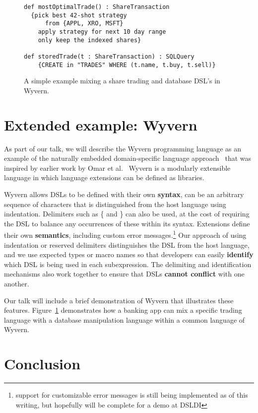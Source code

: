 \documentclass{sigplanconf}
\begin{document}
\begin{figure}[t]
\begin{lstlisting}
def mostOptimalTrade() : ShareTransaction
  {pick best 42-shot strategy
      from {APPL, XRO, MSFT}
    apply strategy for next 10 day range
    only keep the indexed shares}

def storedTrade(t : ShareTransaction) : SQLQuery
    {CREATE in "TRADES" WHERE (t.name, t.buy, t.sell)}
\end{lstlisting}
\caption{A simple example mixing a share trading and database DSL's in Wyvern.}
\label{f:dsl}
\end{figure}


\section{Extended example: Wyvern}

As part of our talk, we will describe the Wyvern programming language
as an example of the naturally embedded domain-specific language
approach~\cite{omar:2014:tsls} that was inspired by earlier work by Omar et al.~\cite{ACC_VLHCC}
Wyvern is a modularly extensible language in which language
extensions can be defined as libraries.

Wyvern allows DSLs to be defined with their own \textbf{syntax}, can be
an arbitrary sequence of characters that is distinguished from the host
language using indentation.  Delimiters such as \{ and \} can also be
used, at the cost of requiring the DSL to balance any occurrences of
these within its syntax.  Extensions define their own \textbf{semantics},
including custom error messages.\footnote{support for customizable
error messages is still being implemented as of this writing, but
hopefully will be complete for a demo at DSLDI}  Our approach of
using indentation or reserved delimiters distinguishes the DSL from
the host language, and we use expected types or macro names so that
developers can easily \textbf{identify} which DSL is being used in each
subexpression.  The delimiting and identification mechanisms also work
together to ensure that DSLs \textbf{cannot conflict} with one another.

Our talk will include a brief demonstration of Wyvern that illustrates
these features. Figure~\ref{f:dsl} demonstrates how a banking app can mix a specific trading language with a database manipulation language within a common language of Wyvern.

\section{Conclusion}
\end{document}
